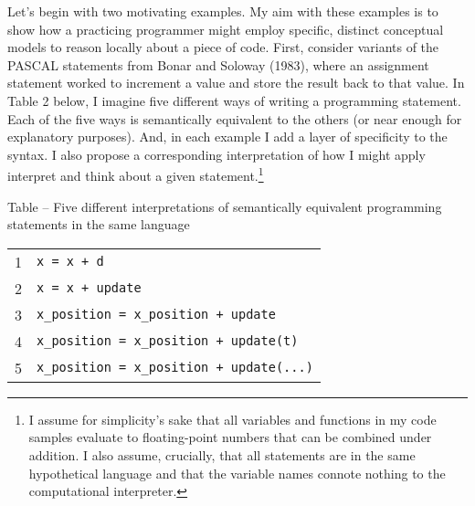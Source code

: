 Let's begin with two motivating examples. My aim with these examples is
to show how a practicing programmer might employ specific, distinct
conceptual models to reason locally about a piece of code. First,
consider variants of the PASCAL statements from Bonar and Soloway
(1983), where an assignment statement worked to increment a value and
store the result back to that value. In Table 2 below, I imagine five
different ways of writing a programming statement. Each of the five ways
is semantically equivalent to the others (or near enough for explanatory
purposes). And, in each example I add a layer of specificity to the
syntax. I also propose a corresponding interpretation of how I might
apply interpret and think about a given statement.\footnote{I assume for
  simplicity's sake that all variables and functions in my code samples
  evaluate to floating-point numbers that can be combined under
  addition. I also assume, crucially, that all statements are in the
  same hypothetical language and that the variable names connote nothing
  to the computational interpreter.}

\protect\hypertarget{ux5fToc252445956}{}{}Table -- Five different
interpretations of semantically equivalent programming statements in the
same language

%
%
\begin{center}
  \begin{tabular}{ | l | l |}
    1 & \texttt{x\ =\ x\ +\ d} \\
    2 & \texttt{x\ =\ x\ +\ update} \\
    3 & \texttt{x\_position\ =\ x\_position\ +\ update} \\
    4 & \texttt{x\_position\ =\ x\_position\ +\ update(t)} \\
    5 & \texttt{x\_position\ =\ x\_position\ +\ update(...)} \\
  \end{tabular}
\end{center}


